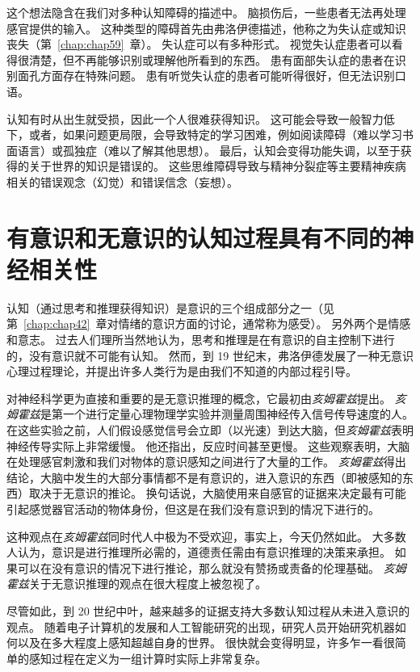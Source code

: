 这个想法隐含在我们对多种认知障碍的描述中。
脑损伤后，一些患者无法再处理感官提供的输入。
这种类型的障碍首先由弗洛伊德描述，他称之为失认症或知识丧失（第~\ref{chap:chap59}~章）。
失认症可以有多种形式。
视觉失认症患者可以看得很清楚，但不再能够识别或理解他所看到的东西。
患有面部失认症的患者在识别面孔方面存在特殊问题。
患有听觉失认症的患者可能听得很好，但无法识别口语。


认知有时从出生就受损，因此一个人很难获得知识。
这可能会导致一般智力低下，或者，如果问题更局限，会导致特定的学习困难，例如阅读障碍（难以学习书面语言）或孤独症（难以了解其他思想）。
最后，认知会变得功能失调，以至于获得的关于世界的知识是错误的。
这些思维障碍导致与精神分裂症等主要精神疾病相关的错误观念（幻觉）和错误信念（妄想）。



\section{有意识和无意识的认知过程具有不同的神经相关性}

认知（通过思考和推理获得知识）是意识的三个组成部分之一（见第~\ref{chap:chap42}~章对情绪的意识方面的讨论，通常称为感受）。
另外两个是情感和意志。
过去人们理所当然地认为，思考和推理是在有意识的自主控制下进行的，没有意识就不可能有认知。
然而，到 19 世纪末，弗洛伊德发展了一种无意识心理过程理论，并提出许多人类行为是由我们不知道的内部过程引导。


对神经科学更为直接和重要的是无意识推理的概念，它最初由\textit{亥姆霍兹}提出。
\textit{亥姆霍兹}是第一个进行定量心理物理学实验并测量周围神经传入信号传导速度的人。
在这些实验之前，人们假设感觉信号会立即（以光速）到达大脑，但\textit{亥姆霍兹}表明神经传导实际上非常缓慢。
他还指出，反应时间甚至更慢。
这些观察表明，大脑在处理感官刺激和我们对物体的意识感知之间进行了大量的工作。
\textit{亥姆霍兹}得出结论，大脑中发生的大部分事情都不是有意识的，进入意识的东西（即被感知的东西）取决于无意识的推论。
换句话说，大脑使用来自感官的证据来决定最有可能引起感觉器官活动的物体身份，但这是在我们没有意识到的情况下进行的。


这种观点在\textit{亥姆霍兹}同时代人中极为不受欢迎，事实上，今天仍然如此。
大多数人认为，意识是进行推理所必需的，道德责任需由有意识推理的决策来承担。
如果可以在没有意识的情况下进行推论，那么就没有赞扬或责备的伦理基础。
\textit{亥姆霍兹}关于无意识推理的观点在很大程度上被忽视了。



尽管如此，到 20 世纪中叶，越来越多的证据支持大多数认知过程从未进入意识的观点。
随着电子计算机的发展和人工智能研究的出现，研究人员开始研究机器如何以及在多大程度上感知超越自身的世界。
很快就会变得明显，许多乍一看很简单的感知过程在定义为一组计算时实际上非常复杂。


